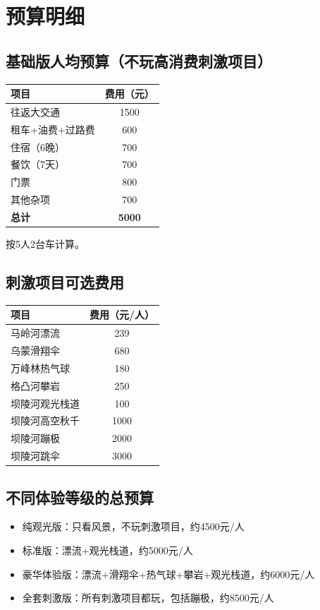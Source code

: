 \documentclass[12pt,a4paper,UTF8]{ctexart}
\begin{document}
\newpage

\section{预算明细}

\subsection{基础版人均预算（不玩高消费刺激项目）}
\begin{table}[h]
\centering
\begin{tabular}{lc}
\toprule
项目 & 费用（元） \\
\midrule
往返大交通 & 1500 \\
租车+油费+过路费 & 600 \\
住宿（6晚） & 700 \\
餐饮（7天） & 700 \\
门票 & 800 \\
其他杂项 & 700 \\
\midrule
\textbf{总计} & \textbf{5000} \\
\bottomrule
\end{tabular}
\end{table}

按5人2台车计算。

\subsection{刺激项目可选费用}
\begin{table}[h]
\centering
\begin{tabular}{lc}
\toprule
项目 & 费用（元/人） \\
\midrule
马岭河漂流 & 239 \\
乌蒙滑翔伞 & 680 \\
万峰林热气球 & 180 \\
格凸河攀岩 & 250 \\
坝陵河观光栈道 & 100 \\
坝陵河高空秋千 & 1000 \\
坝陵河蹦极 & 2000 \\
坝陵河跳伞 & 3000 \\
\bottomrule
\end{tabular}
\end{table}

\subsection{不同体验等级的总预算}
\begin{itemize}
\item 纯观光版：只看风景，不玩刺激项目，约4500元/人
\item 标准版：漂流+观光栈道，约5000元/人
\item 豪华体验版：漂流+滑翔伞+热气球+攀岩+观光栈道，约6000元/人
\item 全套刺激版：所有刺激项目都玩，包括蹦极，约8500元/人
\end{itemize}
\end{document}
